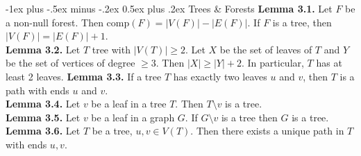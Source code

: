 \documentclass[10pt,landscape]{article}
\makeatletter
\renewcommand{\section}{\@startsection{section}{1}{0mm}%
                                {-1ex plus -.5ex minus -.2ex}%
                                {0.5ex plus .2ex}%
                                {\normalfont\large\bfseries}}
\makeatother
\begin{document}
\begin{multicols}{3}
\section{Trees \& Forests}
\textbf{Lemma 3.1.} Let \( F \) be a non-null forest. Then \( \mbox{comp}(F) = |V(F)| - |E(F)| \). If \( F \) is a tree, then \( |V(F)| = |E(F)| + 1 \). \\
\textbf{Lemma 3.2.} Let \( T \) tree with \( |V(T)| \geq 2 \). Let \( X \) be the set of leaves of \( T \) and \( Y \) be the set of vertices of degree \( \geq 3 \). Then \( |X| \geq |Y| + 2 \). In particular, \( T \) has at least 2 leaves.
\textbf{Lemma 3.3.} If a tree \( T \) has exactly two leaves \( u \) and \( v \), then \( T \) is a path with ends \( u \) and \( v \). \\
\textbf{Lemma 3.4.} Let \( v \) be a leaf in a tree \( T \). Then \( T \setminus v \) is a tree. \\
\textbf{Lemma 3.5.} Let \( v \) be a leaf in a graph \( G \). If \( G \setminus v \) is a tree then \( G \) is a tree. \\
\textbf{Lemma 3.6.} Let \( T \) be a tree, \( u,v \in V(T) \). Then there exists a unique path in \( T \) with ends \( u,v\).

\end{multicols}
\end{document}
